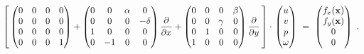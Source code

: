 \begin{equation*}
	\left[ \,
	\begin{pmatrix}
		0 & 0 & 0 & 0 \\
		0 & 0 & 0 & 0 \\
		0 & 0 & 0 & 0 \\
		0 & 0 & 0 & 1
	\end{pmatrix} +
	\begin{pmatrix}
		0 & 0 & \alpha & 0 \\
		0 & 0 & 0 & -\delta \\
		1 & 0 & 0 & 0 \\
		0 & -1 & 0 & 0
	\end{pmatrix} \frac{\pd}{\pd x} +
	\begin{pmatrix}
		0 & 0 & 0 & \beta \\
		0 & 0 & \gamma & 0 \\
		0 & 1 & 0 & 0 \\
		1 & 0 & 0 & 0 \\
	\end{pmatrix} \frac{\pd}{\pd y} \, \right]
	\mkern0mu \cdot \mkern2mu
	\begin{pmatrix}
		u \\ v \\ p \\ \omega
	\end{pmatrix}
	\ = \
	\begin{pmatrix}
		f_x(\mathbf{x}) \\ f_y(\mathbf{x}) \\ 0 \\ 0
	\end{pmatrix} \ .
	\vspace{1mm}
\end{equation*}